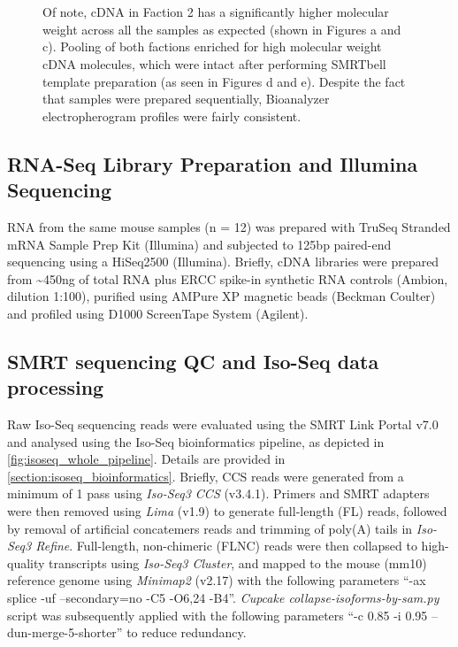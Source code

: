 \begin{figure}[!htp]
{	\\
	\\	 	
	Of note, cDNA in Faction 2 has a significantly higher molecular weight across all the samples as expected (shown in Figures a and c). Pooling of both factions enriched for high molecular weight cDNA molecules, which were intact after performing SMRTbell template preparation (as seen in Figures d and e). Despite the fact that samples were prepared sequentially, Bioanalyzer electropherogram profiles were fairly consistent. 
	}
	\label{fig:isoseq_whole_bioresults}
\end{figure}

\clearpage
\subsection{RNA-Seq Library Preparation and Illumina Sequencing}
RNA from the same mouse samples (n = 12) was prepared with TruSeq Stranded mRNA Sample Prep Kit (Illumina) and subjected to 125bp paired-end sequencing using a HiSeq2500 (Illumina)\cite{Castanho2020}. Briefly, cDNA libraries were prepared from \textasciitilde450ng of total RNA plus ERCC spike-in synthetic RNA controls (Ambion, dilution 1:100), purified using AMPure XP magnetic beads (Beckman Coulter) and profiled using D1000 ScreenTape System (Agilent). 

\subsection{SMRT sequencing QC and Iso-Seq data processing}\label{ch4_methods: isoseq_data}
Raw Iso-Seq sequencing reads were evaluated using the SMRT Link Portal v7.0 and analysed using the Iso-Seq bioinformatics pipeline, as depicted in \cref{fig:isoseq_whole_pipeline}. Details are provided in \cref{section:isoseq_bioinformatics}. Briefly, CCS reads were generated from a minimum of 1 pass using \textit{Iso-Seq3 CCS} (v3.4.1). Primers and SMRT adapters were then removed using \textit{Lima} (v1.9) to generate full-length (FL) reads, followed by removal of artificial concatemers reads and trimming of poly(A) tails in \textit{Iso-Seq3 Refine}. Full-length, non-chimeric (FLNC) reads were then collapsed to high-quality transcripts using \textit{Iso-Seq3 Cluster}, and mapped to the mouse (mm10) reference genome using \textit{Minimap2} (v2.17) with the following parameters “-ax splice -uf --secondary=no -C5 -O6,24 -B4”. \textit{ Cupcake collapse-isoforms-by-sam.py} script was subsequently applied with the following parameters  “-c 0.85 -i 0.95 --dun-merge-5-shorter” to reduce redundancy. 


